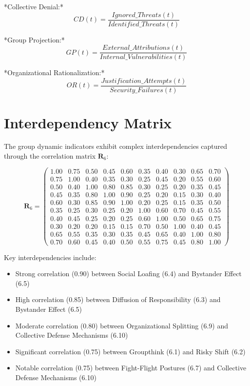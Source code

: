 \documentclass[11pt,a4paper]{article}
\begin{document}
*Collective Denial:*
\begin{equation}
CD(t) = \frac{Ignored\_Threats(t)}{Identified\_Threats(t)}
\end{equation}

*Group Projection:*
\begin{equation}
GP(t) = \frac{External\_Attributions(t)}{Internal\_Vulnerabilities(t)}
\end{equation}

*Organizational Rationalization:*
\begin{equation}
OR(t) = \frac{Justification\_Attempts(t)}{Security\_Failures(t)}
\end{equation}

\section{Interdependency Matrix}

The group dynamic indicators exhibit complex interdependencies captured through the correlation matrix $\mathbf{R}_{6}$:

\begin{equation}
\mathbf{R}_6 = \begin{pmatrix}
1.00 & 0.75 & 0.50 & 0.45 & 0.60 & 0.35 & 0.40 & 0.30 & 0.65 & 0.70 \\
0.75 & 1.00 & 0.40 & 0.35 & 0.30 & 0.25 & 0.45 & 0.20 & 0.55 & 0.60 \\
0.50 & 0.40 & 1.00 & 0.80 & 0.85 & 0.30 & 0.25 & 0.20 & 0.35 & 0.45 \\
0.45 & 0.35 & 0.80 & 1.00 & 0.90 & 0.25 & 0.20 & 0.15 & 0.30 & 0.40 \\
0.60 & 0.30 & 0.85 & 0.90 & 1.00 & 0.20 & 0.25 & 0.15 & 0.35 & 0.50 \\
0.35 & 0.25 & 0.30 & 0.25 & 0.20 & 1.00 & 0.60 & 0.70 & 0.45 & 0.55 \\
0.40 & 0.45 & 0.25 & 0.20 & 0.25 & 0.60 & 1.00 & 0.50 & 0.65 & 0.75 \\
0.30 & 0.20 & 0.20 & 0.15 & 0.15 & 0.70 & 0.50 & 1.00 & 0.40 & 0.45 \\
0.65 & 0.55 & 0.35 & 0.30 & 0.35 & 0.45 & 0.65 & 0.40 & 1.00 & 0.80 \\
0.70 & 0.60 & 0.45 & 0.40 & 0.50 & 0.55 & 0.75 & 0.45 & 0.80 & 1.00
\end{pmatrix}
\end{equation}

Key interdependencies include:
\begin{itemize}
\item Strong correlation (0.90) between Social Loafing (6.4) and Bystander Effect (6.5)
\item High correlation (0.85) between Diffusion of Responsibility (6.3) and Bystander Effect (6.5)
\item Moderate correlation (0.80) between Organizational Splitting (6.9) and Collective Defense Mechanisms (6.10)
\item Significant correlation (0.75) between Groupthink (6.1) and Risky Shift (6.2)
\item Notable correlation (0.75) between Fight-Flight Postures (6.7) and Collective Defense Mechanisms (6.10)
\end{itemize}
\end{document}
